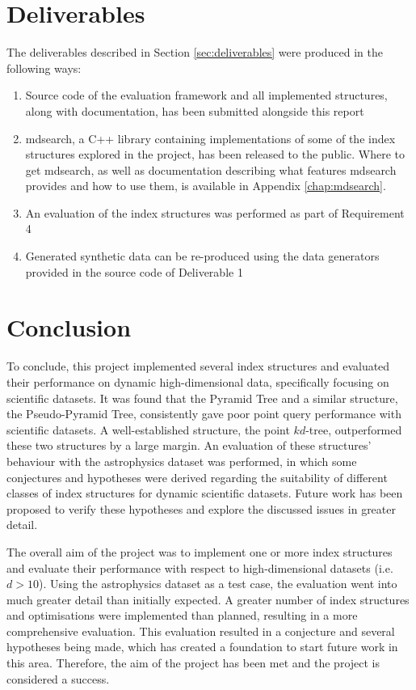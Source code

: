 \section{Deliverables}

The deliverables described in Section \ref{sec:deliverables} were produced in the following ways:
\begin{enumerate}
	\item Source code of the evaluation framework and all implemented structures, along with documentation, has been submitted alongside this report
	\item mdsearch, a C++ library containing implementations of some of the index structures explored in the project, has been released to the public. Where to get mdsearch, as well as documentation describing what features mdsearch provides and how to use them, is available in Appendix \ref{chap:mdsearch}.
	\item An evaluation of the index structures was performed as part of Requirement 4
	\item Generated synthetic data can be re-produced using the data generators provided in the source code of Deliverable 1
\end{enumerate}

\section{Conclusion}

To conclude, this project implemented several index structures and evaluated their performance on dynamic high-dimensional data, specifically focusing on scientific datasets. It was found that the Pyramid Tree and a similar structure, the Pseudo-Pyramid Tree, consistently gave poor point query performance with scientific datasets. A well-established structure, the point $kd$-tree, outperformed these two structures by a large margin. An evaluation of these structures' behaviour with the astrophysics dataset was performed, in which some conjectures and hypotheses were derived regarding the suitability of different classes of index structures for dynamic scientific datasets. Future work has been proposed to verify these hypotheses and explore the discussed issues in greater detail.

The overall aim of the project was to implement one or more index structures and evaluate their performance with respect to high-dimensional datasets (i.e. $d > 10$). Using the astrophysics dataset as a test case, the evaluation went into much greater detail than initially expected. A greater number of index structures and optimisations were implemented than planned, resulting in a more comprehensive evaluation. This evaluation resulted in a conjecture and several hypotheses being made, which has created a foundation to start future work in this area. Therefore, the aim of the project has been met and the project is considered a success.